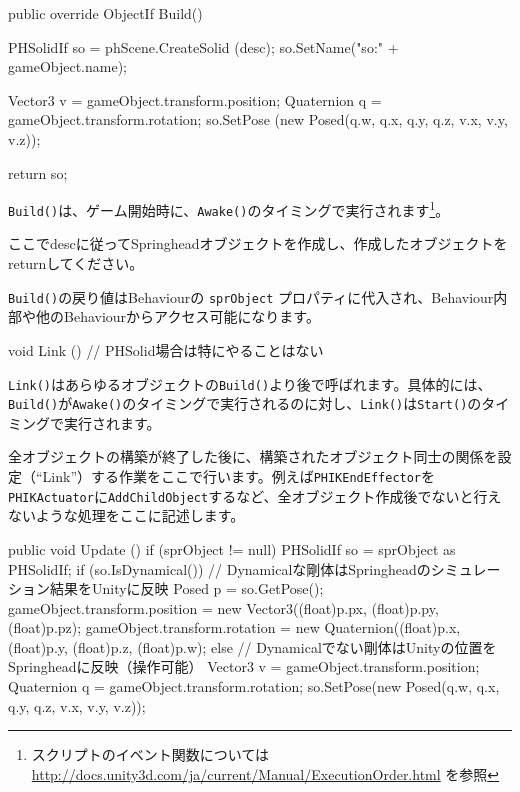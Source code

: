 \begin{sourcecode}
    public override ObjectIf Build() {
        PHSolidIf so = phScene.CreateSolid (desc);
        so.SetName("so:" + gameObject.name);

        Vector3 v = gameObject.transform.position;
        Quaternion q = gameObject.transform.rotation;
        so.SetPose (new Posed(q.w, q.x, q.y, q.z, v.x, v.y, v.z));

        return so;
    }
\end{sourcecode}

\texttt{Build()}は、ゲーム開始時に、\texttt{Awake()}のタイミングで実行されます\footnote{スクリプトのイベント関数については \url{http://docs.unity3d.com/ja/current/Manual/ExecutionOrder.html} を参照}。

\KLUDGE ここでdescに従ってSpringheadオブジェクトを作成し、作成したオブジェクトをreturnしてください。

\texttt{Build()}の戻り値はBehaviourの \texttt{sprObject} プロパティに代入され、Behaviour内部や他のBehaviourからアクセス可能になります。


\begin{sourcecode}
    void Link () {
        // PHSolid場合は特にやることはない
    }
\end{sourcecode}

\texttt{Link()}はあらゆるオブジェクトの\texttt{Build()}より後で呼ばれます。具体的には、\texttt{Build()}が\texttt{Awake()}のタイミングで実行されるのに対し、\texttt{Link()}は\texttt{Start()}のタイミングで実行されます。

\KLUDGE 全オブジェクトの構築が終了した後に、構築されたオブジェクト同士の関係を設定（``Link''）する作業をここで行います。例えば\texttt{PHIKEndEffector}を\texttt{PHIKActuator}に\texttt{AddChildObject}するなど、全オブジェクト作成後でないと行えないような処理をここに記述します。

\begin{sourcecode}
    public void Update () {
        if (sprObject != null) {
            PHSolidIf so = sprObject as PHSolidIf;
            if (so.IsDynamical()) {
                // Dynamicalな剛体はSpringheadのシミュレーション結果をUnityに反映
                Posed p = so.GetPose();
                gameObject.transform.position = new Vector3((float)p.px, (float)p.py, (float)p.pz);
                gameObject.transform.rotation = new Quaternion((float)p.x, (float)p.y, (float)p.z, (float)p.w);
            } else {
                // Dynamicalでない剛体はUnityの位置をSpringheadに反映（操作可能）
                Vector3 v = gameObject.transform.position;
                Quaternion q = gameObject.transform.rotation;
                so.SetPose(new Posed(q.w, q.x, q.y, q.z, v.x, v.y, v.z));
            }
        }
    }
\end{sourcecode}

